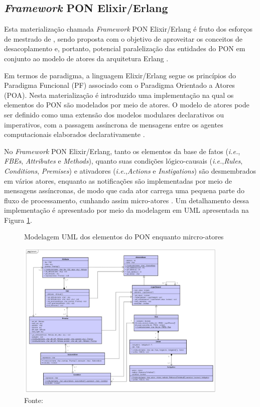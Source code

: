\subsection{\textit{Framework} PON Elixir/Erlang}

Esta materialização chamada \textit{Framework} PON Elixir/Erlang é fruto dos
esforços de mestrado de , sendo proposta com o
objetivo de aproveitar os conceitos de desacoplamento e, portanto, potencial
paralelização das entidades do PON em conjunto ao modelo de atores da
arquitetura Erlang \cite{msc_negrini_2019}.

Em termos de paradigma, a linguagem Elixir/Erlang segue os princípios do
Paradigma Funcional (PF) associado com o Paradigma Orientado a Atores (POA).
Nesta materialização é introduzido uma implementação na qual os elementos do PON
são modelados por meio de atores. O modelo de atores pode ser definido como uma
extensão dos modelos modulares declarativos ou imperativos, com a passagem
assíncrona de mensagens entre os agentes computacionais elaborados
declarativamente \cite{msc_negrini_2019}.

No \textit{Framework} PON Elixir/Erlang, tanto os elementos da base de fatos
(\textit{i.e.}, \textit{FBEs}, \textit{Attributes} e \textit{Methods}), quanto
suas condições lógico-causais (\textit{i.e.},\textit{Rules},
\textit{Conditions}, \textit{Premises}) e ativadores
(\textit{i.e.},\textit{Actions} e \textit{Instigations}) são desmembrados em
vários atores, enquanto as notificações são implementadas por meio de mensagens
assíncronas, de modo que cada ator carrega uma pequena parte do fluxo de
processamento, cunhando assim micro-atores \cite{msc_negrini_2019}. Um
detalhamento dessa implementação é apresentado por meio da modelagem em UML
apresentada na Figura \ref{fig:pon_elixir_uml}.

\begin{figure}[!htb]
  \centering
  \caption{Modelagem UML dos elementos do PON enquanto mircro-atores}
  \includegraphics[width=0.9\textwidth]{../figures/pon_elixir_uml.png}
  \smallskip
  \caption*{Fonte: }
  \label{fig:pon_elixir_uml}
\end{figure}
\FloatBarrier

